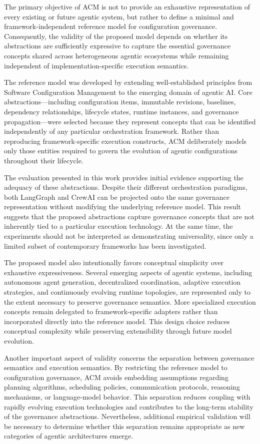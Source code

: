 \documentclass[10pt]{article}
\begin{document}
The primary objective of ACM is not to provide an exhaustive representation of every existing or future agentic system, but rather to define a minimal and framework-independent reference model for configuration governance. Consequently, the validity of the proposed model depends on whether its abstractions are sufficiently expressive to capture the essential governance concepts shared across heterogeneous agentic ecosystems while remaining independent of implementation-specific execution semantics.

The reference model was developed by extending well-established principles from Software Configuration Management to the emerging domain of agentic AI. Core abstractions—including configuration items, immutable revisions, baselines, dependency relationships, lifecycle states, runtime instances, and governance propagation—were selected because they represent concepts that can be identified independently of any particular orchestration framework. Rather than reproducing framework-specific execution constructs, ACM deliberately models only those entities required to govern the evolution of agentic configurations throughout their lifecycle.

The evaluation presented in this work provides initial evidence supporting the adequacy of these abstractions. Despite their different orchestration paradigms, both LangGraph and CrewAI can be projected onto the same governance representation without modifying the underlying reference model. This result suggests that the proposed abstractions capture governance concepts that are not inherently tied to a particular execution technology. At the same time, the experiments should not be interpreted as demonstrating universality, since only a limited subset of contemporary frameworks has been investigated.

The proposed model also intentionally favors conceptual simplicity over exhaustive expressiveness. Several emerging aspects of agentic systems, including autonomous agent generation, decentralized coordination, adaptive execution strategies, and continuously evolving runtime topologies, are represented only to the extent necessary to preserve governance semantics. More specialized execution concepts remain delegated to framework-specific adapters rather than incorporated directly into the reference model. This design choice reduces conceptual complexity while preserving extensibility through future model evolution.

Another important aspect of validity concerns the separation between governance semantics and execution semantics. By restricting the reference model to configuration governance, ACM avoids embedding assumptions regarding planning algorithms, scheduling policies, communication protocols, reasoning mechanisms, or language-model behavior. This separation reduces coupling with rapidly evolving execution technologies and contributes to the long-term stability of the governance abstractions. Nevertheless, additional empirical validation will be necessary to determine whether this separation remains appropriate as new categories of agentic architectures emerge.
\end{document}

